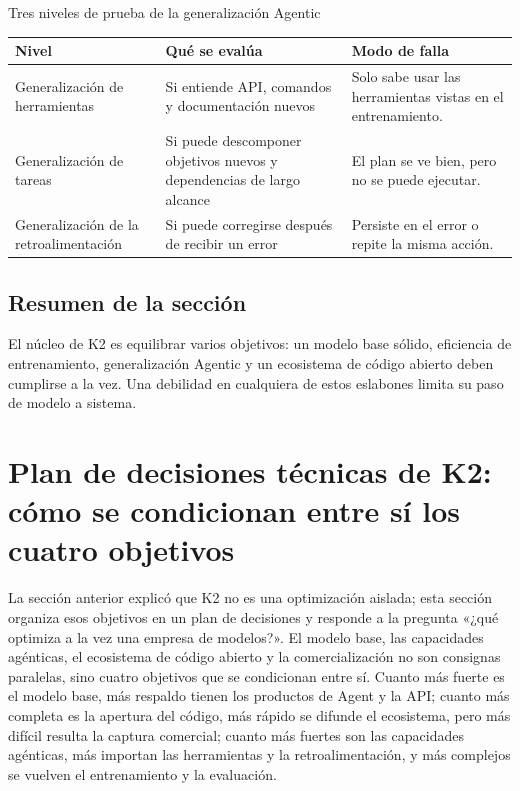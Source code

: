 \documentclass[a4paper]{article}
\begin{document}
\begin{knowledgebox}{Tres niveles de prueba de la generalización Agentic}
\begin{tabularx}{\textwidth}{p{}p{}X}
\toprule
Nivel & Qué se evalúa & Modo de falla \\
\midrule
Generalización de herramientas & Si entiende API, comandos y documentación nuevos & Solo sabe usar las herramientas vistas en el entrenamiento. \\
Generalización de tareas & Si puede descomponer objetivos nuevos y dependencias de largo alcance & El plan se ve bien, pero no se puede ejecutar. \\
Generalización de la retroalimentación & Si puede corregirse después de recibir un error & Persiste en el error o repite la misma acción. \\
\bottomrule
\end{tabularx}
\end{knowledgebox}

\subsection{Resumen de la sección}

El núcleo de K2 es equilibrar varios objetivos: un modelo base sólido, eficiencia de entrenamiento, generalización Agentic y un ecosistema de código abierto deben cumplirse a la vez. Una debilidad en cualquiera de estos eslabones limita su paso de modelo a sistema.
\section{Plan de decisiones técnicas de K2: cómo se condicionan entre sí los cuatro objetivos}

La sección anterior explicó que K2 no es una optimización aislada; esta sección organiza esos objetivos en un plan de decisiones y responde a la pregunta «¿qué optimiza a la vez una empresa de modelos?». El modelo base, las capacidades agénticas, el ecosistema de código abierto y la comercialización no son consignas paralelas, sino cuatro objetivos que se condicionan entre sí. Cuanto más fuerte es el modelo base, más respaldo tienen los productos de Agent y la API; cuanto más completa es la apertura del código, más rápido se difunde el ecosistema, pero más difícil resulta la captura comercial; cuanto más fuertes son las capacidades agénticas, más importan las herramientas y la retroalimentación, y más complejos se vuelven el entrenamiento y la evaluación.
\end{document}

